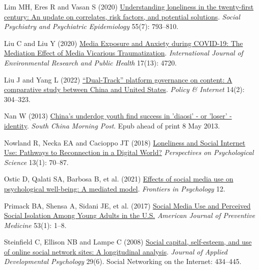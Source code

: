 \documentclass[
  letterpaper,
  DIV=11,
  numbers=noendperiod]{scrartcl}
\newlength{\cslhangindent}
\newlength{\cslentryspacingunit} %
\newenvironment{CSLReferences}[2] %
 {%
  \setlength{\parindent}{0pt}
  \ifodd #1
  \let\oldpar\par
  \def\par{\hangindent=\cslhangindent\oldpar}
  \fi
  \setlength{\parskip}{#2\cslentryspacingunit}
 }%
 {}
\begin{document}
\begin{CSLReferences}{1}{0}
\leavevmode{}%
Lim MH, Eres R and Vasan S (2020)
\href{https://doi.org/10.1007/s00127-020-01889-7}{Understanding
loneliness in the twenty-first century: An update on correlates, risk
factors, and potential solutions}. \emph{Social Psychiatry and
Psychiatric Epidemiology} 55(7): 793--810.

\leavevmode{}%
Liu C and Liu Y (2020)
\href{https://doi.org/10.3390/ijerph17134720}{Media Exposure and Anxiety
during COVID-19: The Mediation Effect of Media Vicarious
Traumatization}. \emph{International Journal of Environmental Research
and Public Health} 17(13): 4720.

\leavevmode{}%
Liu J and Yang L (2022)
\href{https://doi.org/10.1002/poi3.307}{{``}Dual-Track{''} platform
governance on content: A comparative study between China and United
States}. \emph{Policy \& Internet} 14(2): 304--323.

\leavevmode{}%
Nan W (2013)
\href{https://www.scmp.com/news/china/article/1232976/chinas-underdog-youth-find-success-diaosi-or-loser-identity}{China's
underdog youth find success in 'diaosi' - or 'loser' - identity}.
\emph{South China Morning Post}. Epub ahead of print 8 May 2013.

\leavevmode{}%
Nowland R, Necka EA and Cacioppo JT (2018)
\href{https://doi.org/10.1177/1745691617713052}{Loneliness and Social
Internet Use: Pathways to Reconnection in a Digital World?}
\emph{Perspectives on Psychological Science} 13(1): 70--87.

\leavevmode{}%
Ostic D, Qalati SA, Barbosa B, et al. (2021)
\href{https://www.frontiersin.org/articles/10.3389/fpsyg.2021.678766}{Effects
of social media use on psychological well-being: A mediated model}.
\emph{Frontiers in Psychology} 12.

\leavevmode{}%
Primack BA, Shensa A, Sidani JE, et al. (2017)
\href{https://doi.org/10.1016/j.amepre.2017.01.010}{Social Media Use and
Perceived Social Isolation Among Young Adults in the U.S.}
\emph{American Journal of Preventive Medicine} 53(1): 1--8.

\leavevmode{}%
Steinfield C, Ellison NB and Lampe C (2008)
\href{https://doi.org/10.1016/j.appdev.2008.07.002}{Social capital,
self-esteem, and use of online social network sites: A longitudinal
analysis}. \emph{Journal of Applied Developmental Psychology} 29(6).
Social Networking on the Internet: 434--445.


\end{CSLReferences}
\end{document}
